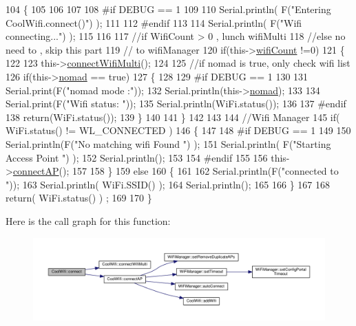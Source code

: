 \begin{DoxyCode}
104 \{       
105 
106 
107 
108 \textcolor{preprocessor}{#if DEBUG == 1 }
109 
110     Serial.println( F(\textcolor{stringliteral}{"Entering CoolWifi.connect()"}) );
111 
112 \textcolor{preprocessor}{#endif}
113 
114     Serial.println( F(\textcolor{stringliteral}{"Wifi connecting..."}) );
115 
116 
117     \textcolor{comment}{//if WifiCount > 0 , lunch wifiMulti}
118     \textcolor{comment}{//else no need to , skip this part}
119     \textcolor{comment}{// to wifiManager  }
120     \textcolor{keywordflow}{if}(this->\hyperlink{class_cool_wifi_ab133bd92fcb895b884deecd6678592e4}{wifiCount} !=0)
121     \{
122     
123         this->\hyperlink{class_cool_wifi_a419de92d738f14b7444cf822b3ab0070}{connectWifiMulti}();
124         
125         \textcolor{comment}{//if nomad is true, only check wifi list}
126         \textcolor{keywordflow}{if}(this->\hyperlink{class_cool_wifi_ab7d9643c4af7bac3be331ef008b2ea27}{nomad} == \textcolor{keyword}{true})
127         \{
128     
129 \textcolor{preprocessor}{        #if DEBUG == 1}
130     
131             Serial.print(F(\textcolor{stringliteral}{"nomad mode :"}));
132             Serial.println(this->\hyperlink{class_cool_wifi_ab7d9643c4af7bac3be331ef008b2ea27}{nomad});
133         
134             Serial.print(F(\textcolor{stringliteral}{"Wifi status: "}));
135             Serial.println(WiFi.status());
136         
137 \textcolor{preprocessor}{        #endif  }
138             \textcolor{keywordflow}{return}(WiFi.status());  
139         \}
140 
141     \}
142 
143 
144     \textcolor{comment}{//Wifi Manager}
145     \textcolor{keywordflow}{if}( WiFi.status() != WL\_CONNECTED ) 
146     \{
147 
148 \textcolor{preprocessor}{    #if DEBUG == 1 }
149     
150         Serial.println(F(\textcolor{stringliteral}{"No matching wifi Found "}) );
151         Serial.println( F(\textcolor{stringliteral}{"Starting Access Point "}) );  
152         Serial.println();
153 
154 \textcolor{preprocessor}{    #endif}
155         
156         this->\hyperlink{class_cool_wifi_a7c857f27161782f5ef1d62d552aff971}{connectAP}();     
157         
158     \}
159     \textcolor{keywordflow}{else}
160     \{
161 
162         Serial.println(F(\textcolor{stringliteral}{"connected to "}));
163         Serial.println( WiFi.SSID() );
164         Serial.println();
165     
166     \}
167     
168     \textcolor{keywordflow}{return}( WiFi.status() ) ;
169 
170 \}
\end{DoxyCode}
Here is the call graph for this function\+:\nopagebreak
\begin{figure}[H]
\begin{center}
\leavevmode
\includegraphics[width=350pt]{d7/d29/class_cool_wifi_ad060353050f40d032a2dbf9e54a768bf_cgraph}
\end{center}
\end{figure}
